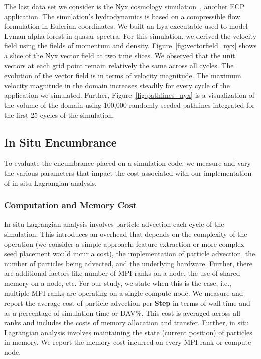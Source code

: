 The last data set we consider is the Nyx cosmology simulation~\cite{almgren2013nyx}, another ECP application.
%
The simulation's hydrodynamics is based on a compressible flow formulation in Eulerian coordinates. 
%
We built an Lya executable used to model Lyman-alpha forest in quasar spectra.
%
For this simulation, we derived the velocity field using the fields of momentum and density.
%
Figure~\ref{fig:vectorfield_nyx} shows a slice of the Nyx vector field at two time slices.
%
We observed that the unit vectors at each grid point remain relatively the same across all cycles.
%
The evolution of the vector field is in terms of velocity magnitude.
%
The maximum velocity magnitude in the domain increases steadily for every cycle of the application we simulated.
%
Further, Figure~\ref{fig:pathlines_nyx} is a visualization of the volume of the domain using 100,000 randomly seeded pathlines integrated for the first 25 cycles of the simulation.
%



\subsection{In Situ Encumbrance}
\label{sec:encumbrance}

To evaluate the encumbrance placed on a simulation code, we measure and vary the various parameters that impact the cost associated with our implementation of in situ Lagrangian analysis.

\subsubsection{Computation and Memory Cost}

In situ Lagrangian analysis involves particle advection each cycle of the simulation. 
%
This introduces an overhead that depends on the complexity of the operation (we consider a simple approach; feature extraction or more complex seed placement would incur a cost), the implementation of particle advection, the number of particles being advected, and the underlying hardware.
%
Further, there are additional factors like number of MPI ranks on a node, the use of shared memory on a node, etc. 
%
For our study, we state when this is the case, i.e., multiple MPI ranks are operating on a single compute node.
%
We measure and report the average cost of particle advection per \textbf{Step} in terms of wall time and as a percentage of simulation time or DAV\%. 
%
This cost is averaged across all ranks and includes the costs of memory allocation and transfer.
%
Further, in situ Lagrangian analysis involves maintaining the state (current position) of particles in memory. 
%
We report the memory cost incurred on every MPI rank or compute node.

